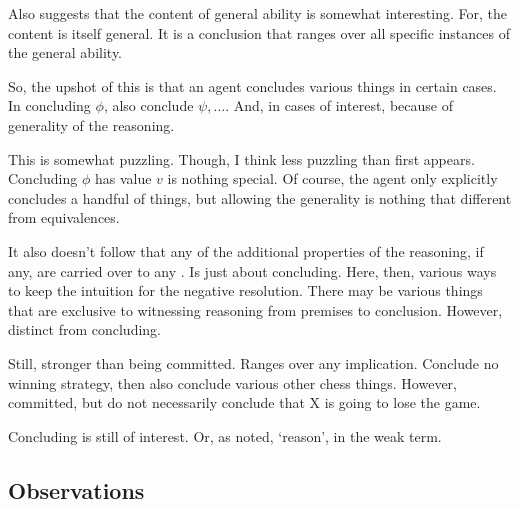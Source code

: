 \begin{note}
  Also suggests that the content of general ability is somewhat interesting.
  For, the content is itself general.
  It is a conclusion that ranges over all specific instances of the general ability.
\end{note}

\begin{note}[Terminology]
  So, the upshot of this is that an agent concludes various things in certain cases.
  In concluding \(\phi\), also conclude \(\psi,\dots\).
  And, in cases of interest, because of generality of the reasoning.

  This is somewhat puzzling.
  Though, I think less puzzling than first appears.
  Concluding \(\phi\) has value \(v\) is nothing special.
  Of course, the agent only explicitly concludes a handful of things, but allowing the generality is nothing that different from equivalences.

  It also doesn't follow that any of the additional properties of the reasoning, if any, are carried over to any .
  Is just about concluding.
  Here, then, various ways to keep the intuition for the negative resolution.
  There may be various things that are exclusive to witnessing reasoning from premises to conclusion.
  However, distinct from concluding.

  Still, stronger than being committed.
  Ranges over any implication.
  Conclude no winning strategy, then also conclude various other chess things.
  However, committed, but do not necessarily conclude that X is going to lose the game.

  Concluding is still of interest.
  Or, as noted, `reason', in the weak term.
\end{note}

\subsection{Observations}
\label{sec:overview:observations}

